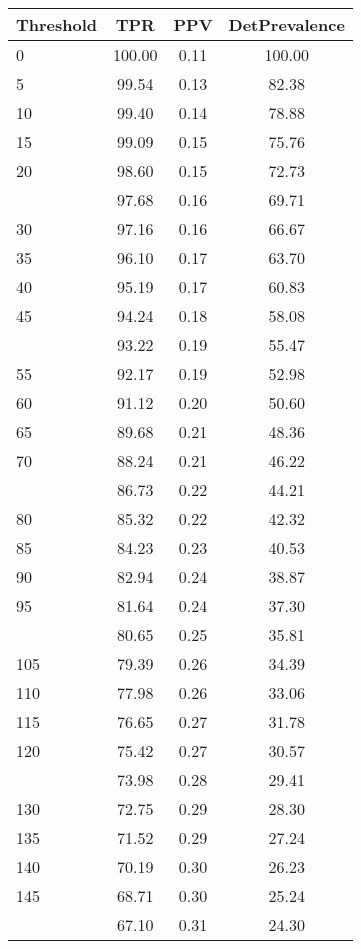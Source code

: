 \begin{table}[ht]
\centering
\begin{tabular}{lccc}
  \toprule
Threshold & TPR & PPV & DetPrevalence \\ 
  \midrule
0 & 100.00 & 0.11 & 100.00 \\ 
  5 & 99.54 & 0.13 & 82.38 \\ 
  10 & 99.40 & 0.14 & 78.88 \\ 
  15 & 99.09 & 0.15 & 75.76 \\ 
  20 & 98.60 & 0.15 & 72.73 \\ 
   \addlinespace
25 & 97.68 & 0.16 & 69.71 \\ 
  30 & 97.16 & 0.16 & 66.67 \\ 
  35 & 96.10 & 0.17 & 63.70 \\ 
  40 & 95.19 & 0.17 & 60.83 \\ 
  45 & 94.24 & 0.18 & 58.08 \\ 
   \addlinespace
50 & 93.22 & 0.19 & 55.47 \\ 
  55 & 92.17 & 0.19 & 52.98 \\ 
  60 & 91.12 & 0.20 & 50.60 \\ 
  65 & 89.68 & 0.21 & 48.36 \\ 
  70 & 88.24 & 0.21 & 46.22 \\ 
   \addlinespace
75 & 86.73 & 0.22 & 44.21 \\ 
  80 & 85.32 & 0.22 & 42.32 \\ 
  85 & 84.23 & 0.23 & 40.53 \\ 
  90 & 82.94 & 0.24 & 38.87 \\ 
  95 & 81.64 & 0.24 & 37.30 \\ 
   \addlinespace
100 & 80.65 & 0.25 & 35.81 \\ 
  105 & 79.39 & 0.26 & 34.39 \\ 
  110 & 77.98 & 0.26 & 33.06 \\ 
  115 & 76.65 & 0.27 & 31.78 \\ 
  120 & 75.42 & 0.27 & 30.57 \\ 
   \addlinespace
125 & 73.98 & 0.28 & 29.41 \\ 
  130 & 72.75 & 0.29 & 28.30 \\ 
  135 & 71.52 & 0.29 & 27.24 \\ 
  140 & 70.19 & 0.30 & 26.23 \\ 
  145 & 68.71 & 0.30 & 25.24 \\ 
   \addlinespace
150 & 67.10 & 0.31 & 24.30 \\ 

\end{tabular}
\end{table}
